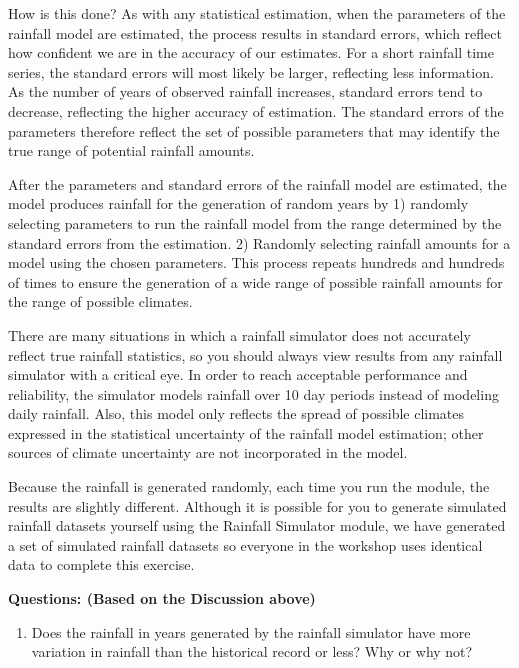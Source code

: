 \documentclass[letterpaper,10pt,english]{sphinxmanual}
\begin{document}
How is this done? As with any statistical estimation, when the parameters of the rainfall model are estimated, the process results in standard errors, which reflect how confident we are in the accuracy of our estimates. For a short rainfall time series, the standard errors will most likely be larger, reflecting less information. As the number of years of observed rainfall increases, standard errors tend to decrease, reflecting the higher accuracy of estimation. The standard errors of the parameters therefore reflect the set of possible parameters that may identify the true range of potential rainfall amounts.

After the parameters and standard errors of the rainfall model are estimated, the model produces rainfall for the generation of random years by 1) randomly selecting parameters to run the rainfall model from the range determined by the standard errors from the estimation. 2) Randomly selecting rainfall amounts for a model using the chosen parameters. This process repeats hundreds and hundreds of times to ensure the generation of a wide range of possible rainfall amounts for the range of possible climates.

There are many situations in which a rainfall simulator does not accurately reflect true rainfall statistics, so you should always view results from any rainfall simulator with a critical eye. In order to reach acceptable performance and reliability, the simulator models rainfall over 10 day periods instead of modeling daily rainfall. Also, this model only reflects the spread of possible climates expressed in the statistical uncertainty of the rainfall model estimation; other sources of climate uncertainty are not incorporated in the model.

Because the rainfall is generated randomly, each time you run the module, the results are slightly different. Although it is possible for you to generate simulated rainfall datasets yourself using the Rainfall Simulator module, we have generated a set of simulated rainfall datasets so everyone in the workshop uses identical data to complete this exercise.

\textbf{Questions: (Based on the Discussion above)}
\begin{enumerate}
\item {} 
Does the rainfall in years generated by the rainfall simulator have more variation in rainfall than the historical record or less?  Why or why not?

\end{enumerate}
\end{document}
